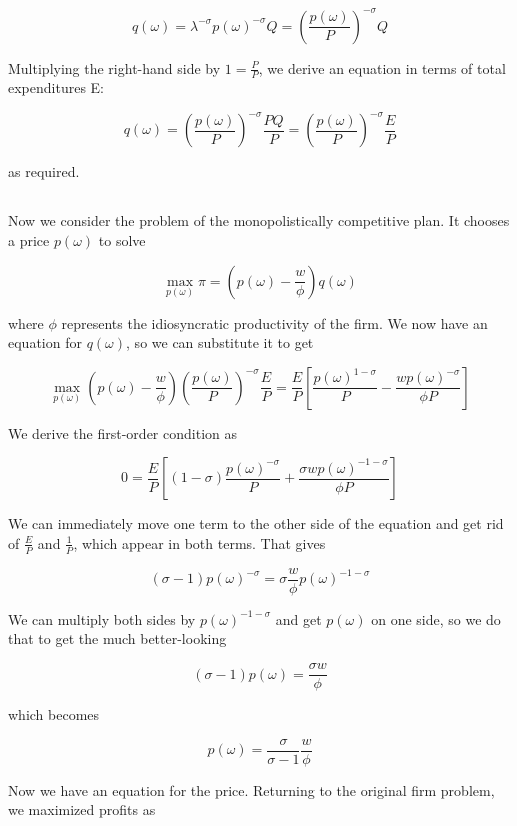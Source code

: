 \documentclass[12pt, letterpaper]{article}
\begin{document}
	\[ q(\omega) = \lambda^{-\sigma} p(\omega)^{-\sigma} Q = \left(\frac{p(\omega)}{P}\right)^{-\sigma} Q  \]

	Multiplying the right-hand side by \(1 = \frac{P}{P}\), we derive an equation in terms of total expenditures E:

	\[ q(\omega) = \left(\frac{p(\omega)}{P}\right)^{-\sigma} \frac{PQ}{P} = \left(\frac{p(\omega)}{P}\right)^{-\sigma} \frac{E}{P} \] 

	as required.

    \subsection{}

    Now we consider the problem of the monopolistically competitive plan. It chooses a price \(p(\omega)\) to solve

	\[ \max_{p(\omega)} \pi = \left( p(\omega) - \frac{w}{\phi} \right)  q(\omega)   \]

	where \(\phi\) represents the idiosyncratic productivity of the firm. We now have an equation for \(q(\omega)\), so we can substitute it to get 

	\[ \max_{p(\omega)} \left( p(\omega) - \frac{w}{\phi} \right) \left(\frac{p(\omega)}{P}\right)^{-\sigma} \frac{E}{P} = \frac{E}{P} \left[ \frac{p(\omega)^{1 - \sigma}}{P} - \frac{w p(\omega)^{-\sigma}}{\phi P} \right]  \]

	We derive the first-order condition as

	\[ 0 = \frac{E}{P} \left[ (1 - \sigma) \frac{p(\omega)^{-\sigma}}{P} + \frac{\sigma w p(\omega)^{-1 - \sigma}}{\phi P} \right]      \]

	We can immediately move one term to the other side of the equation and get rid of \(\frac{E}{P}\) and \(\frac{1}{P}\), which appear in both terms. That gives

	\[ (\sigma - 1) p(\omega)^{-\sigma} = \sigma \frac{w}{\phi} p(\omega)^{-1 - \sigma}    \]

	We can multiply both sides by \(p(\omega)^{- 1 - \sigma}\) and get \(p(\omega)\) on one side, so we do that to get the much better-looking 
	
	\[ (\sigma - 1) p(\omega) = \frac{\sigma w}{\phi}   \]

	which becomes

	\[ p(\omega) = \frac{\sigma}{\sigma - 1} \frac{w}{\phi}    \]

	Now we have an equation for the price. Returning to the original firm problem, we maximized profits as
\end{document}

